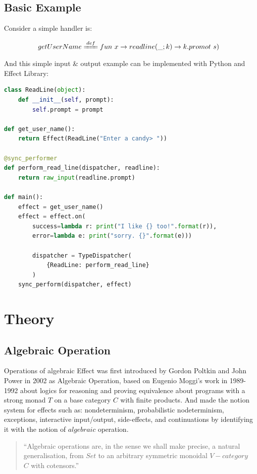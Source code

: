\documentclass{article}
\begin{document}
\subsection{Basic Example}

Consider a simple handler is:

\begin{gather}
  getUserName \xlongequal[]{def} fun\ x \rightarrow readline(\_; k) \rightarrow k.promot\ s)
\end{gather}

And this simple input \& output example can be implemented with Python and Effect Library\cite{python-effect}:

\begin{lstlisting}[language=Python]
class ReadLine(object):
    def __init__(self, prompt):
        self.prompt = prompt

def get_user_name():
    return Effect(ReadLine("Enter a candy> "))

@sync_performer
def perform_read_line(dispatcher, readline):
    return raw_input(readline.prompt)

def main():
    effect = get_user_name()
    effect = effect.on(
        success=lambda r: print("I like {} too!".format(r)),
        error=lambda e: print("sorry. {}".format(e)))

        dispatcher = TypeDispatcher(
            {ReadLine: perform_read_line}
        )
    sync_perform(dispatcher, effect)
\end{lstlisting}


\section{Theory}
\subsection{Algebraic Operation}
Operations of algebraic Effect was first introduced by Gordon Poltkin and John Power in 2002 \cite{Plotkin2003} as Algebraic Operation, based on Eugenio Moggi's work \cite{39155, MOGGI91} in 1989-1992 about logics for reasoning and proving equivalence about programs with a strong monad $T$ on a base category $C$ with finite products\cite{Plotkin2003, MOGGI91}. And made the notion system for effects such as: nondeterminism, probabilistic nodeterminism, exceptions, interactive input/output, side-effects, and continuations by identifying it with the notion of $algebraic$ operation.

\begin{quotation}
  ``Algebraic operations are, in the sense we shall make precise, a natural generalisation, from $Set$ to an arbitrary symmetric monoidal $V-category$ $C$ with cotensors.''\cite{Plotkin2003}
\end{quotation}
\end{document}
